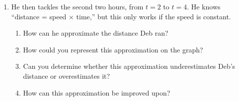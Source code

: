 \documentclass[main]{subfiles}
\begin{document}
\begin{enumerate}
\begin{enumerate}
    \pspace{\vfill}

    \begin{solution}
    We can find Deb's \emph{exact} distance during the first 2 hours
    easily: Deb runs at a constant speed of 7 miles/hour, so she runs a
    total distance of (7 miles/hour)(2 hours) = 14 miles.  We can
    visualize this as the area of a rectangle on the graph of Deb's speed.
    
    On the graph, this distance is represented as an area and not a length 
    because the horizontal axis has units of hours and the vertical axis has
    units of miles/hour, so an area on the graph has units of 
    $\text{hours} \times \frac{\text{miles}}{\text{hours}} = \text{miles}$.
    \end{solution}

  \item He then tackles the second two hours, 
    from $t=2$ to $t=4$. He knows ``distance = speed $\times$ time,''
    but this only works if the speed is constant.
    
    \begin{minipage}{0.57\textwidth}\vspace{-80pt}
      \begin{enumerate}[left=-6pt]

      \item
      How can he approximate the distance Deb ran?

      \item How could you represent this approximation
      on the graph?

      \item Can you determine whether this approximation
      underestimates Deb's distance or overestimates it?

      \item How can this approximation be improved upon?
      

\end{enumerate}
\end{minipage}
\end{enumerate}
\end{enumerate}
\end{document}
